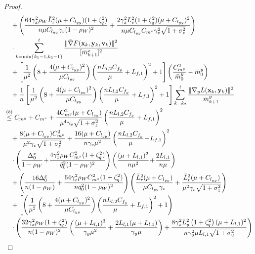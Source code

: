\documentclass{article}
\theoremstyle{plain}
\theoremstyle{definition}
\theoremstyle{remark}
\begin{document}
\begin{proof}
\begin{align}
&\quad + \left(\frac{64 \gamma_x^2 \rho_W \bar{L}_r^2(\mu + C_{l_{yy}})(1 + \zeta_q^2)}{n\mu C_{l_{yy}}\gamma_v(1 - \rho_W)^2} + \frac{2\gamma_x^2L_v^2(1+\zeta_q^2)(\mu + C_{l_{yy}})^2}{n\mu C_{l_{yy}}C_{m^v}\gamma_v^2\sqrt{1+\sigma_z^2}}\right)\notag\\
&\quad\cdot\sum_{k=\min\{k_1-1,k_3-1\}}^{t} 
 \frac{\| \bar{\nabla} F(\mathbf{x}_{k},\mathbf{y}_{k},\mathbf{v}_{k})\|^2}{[\bar{m}^x_{k+1}]^2}\notag \\
&\quad  +\left[ \frac{1}{\mu^2}\left(8+\frac{4(\mu + C_{l_{yy}})^2}{\mu C_{l_{yy}}} \right)\left(\frac{nL_{l,2}C_{f_y}}{\mu}+L_{f,1}\right)^2+1\right]\left(\frac{C_{m^y}^2}{\bar{m}^y_0} - {\bar{m}^y_0}\right)  \notag \\
&\quad  +\frac{1}{n}\left[ \frac{1}{\mu^2}\left(8+\frac{4(\mu + C_{l_{yy}})^2}{\mu C_{l_{yy}}} \right)\left(\frac{nL_{l,2}C_{f_y}}{\mu}+L_{f,1}\right)^2+1\right]\sum_{k=k_2}^t\frac{\|\nabla_yL(\mathbf{x}_k,\mathbf{y}_k)\|^2}{\bar{m}_{k+1}^y}  \notag \\
&\overset{(b)}{\leq} C_{m^y} + C_{m^v} +\frac{4C_{m^y}^2(\mu + C_{l_{yy}})}{\mu^4\gamma_v\sqrt{1+\sigma_z^2}}\left(\frac{nL_{l,2}C_{f_y}}{\mu}+L_{f,1}\right)^2   \notag \\
&\quad + \frac{8(\mu + C_{l_{yy}})C_{m^v}^2}{\mu^2\gamma_v\sqrt{1+\sigma_z^2}}+ \frac{16(\mu + C_{l_{yy}})}{n\gamma_v\mu^2}\left(\frac{nL_{l,2}C_{f_y}}{\mu}\!+\!L_{f,1}\right)^2 \nonumber\\
&\quad\cdot\left(\frac{\Delta_0^x}{1-\rho_W}\!+\!\frac{4 \gamma_x^2 \rho_WC_{m^x}^2 (1 + \zeta_q^2)}{\bar{q}_0^2(1 - \rho_W)^2} \right)\left(\frac{(\mu+L_{l,1})^2}{n\mu^2 }\!+\!\frac{2L_{l,1}}{n\mu }\right)\notag \\
&\quad+\left(\frac{16\Delta_0^x}{n(1-\rho_W)}+\frac{64\gamma_x^2\rho_WC_{m^x}^2(1+\zeta_q^2)}{n\bar{q}_0^2(1-\rho_W)^2}\right)\left(\frac{ \bar{L}_r^2(\mu + C_{l_{yy}})}{\mu C_{l_{yy}}\gamma_v}+\frac{\bar{L}_r^2(\mu+C_{l_{yy}})}{\mu^2\gamma_v\sqrt{1+\sigma_z^2}}\right) \notag \\
&\quad + \left[\left( \frac{1}{\mu^2}\left(8+\frac{4(\mu + C_{l_{yy}})^2}{\mu C_{l_{yy}}} \right)\left(\frac{nL_{l,2}C_{f_y}}{\mu}+L_{f,1}\right)^2+1\right)  \right.\notag \\
&\quad \cdot\left(\frac{32 \gamma_x^2 \rho_W(1 + \zeta_q^2)}{n(1 - \rho_W)^2} \left(\frac{(\mu+L_{l,1})^3}{\gamma_y\mu^2}+\frac{2L_{l,1}(\mu+L_{l,1})}{\gamma_y\mu}\right)+\frac{8\gamma_x^2  L_y^2\left( 1 + \zeta_q^2 \right) (\mu + L_{l,1})^2}{n\gamma_y^2\mu L_{l,1}\sqrt{1+\sigma_u^2}}\right)\nonumber\\

\end{align}
\end{proof}
\end{document}
